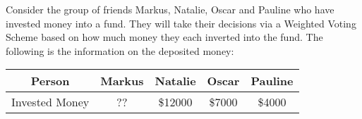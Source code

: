 \documentclass[12pt]{exam}
\begin{document}
\begin{enumerate}
Consider the group of friends Markus, Natalie, Oscar and Pauline who have invested money into a fund. They will take their decisions via a Weighted Voting Scheme based on how much money they each inverted into the fund. The following is the information on the deposited money:

\begin{table}[h]
    \centering
    \begin{tabular}{ccccc}
        \toprule
    Person & Markus      & Natalie      & Oscar      & Pauline            \\
    \midrule
    Invested Money & ?? & \$12000   & \$7000 &\$4000   \\
    \bottomrule
    \end{tabular}
    \end{table}


\end{enumerate}
\end{document}
